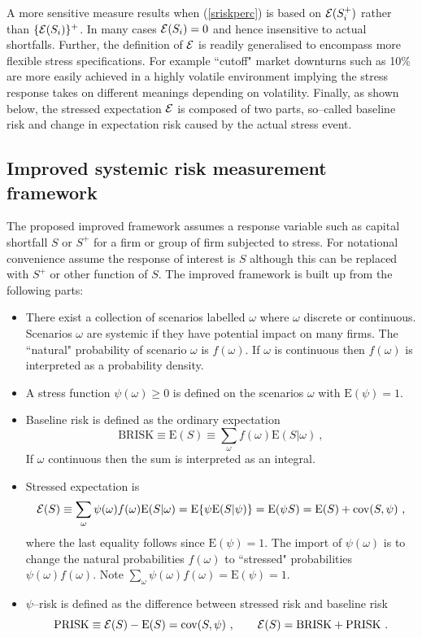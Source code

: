 \documentclass[authoryear]{elsarticle}
\newcommand{\E}{\mathrm{E}}
\newcommand{\cov}{\mathrm{cov}}
\newcommand{\Ex}{{\cal E}}
\newcommand{\Es}{\Ex}
\newcommand{\bi}{\begin{itemize}}
\newcommand{\ei}{\end{itemize}}
\renewcommand{\i}{\item}
\newcommand{\br}{\ensuremath{\mathrm{BRISK}}}
\newcommand{\pr}{\ensuremath{\mathrm{PRISK}}}
\newcommand{\eref}[1]{(\ref{#1})}
\newcommand{\cq}{\ , \qquad}
\newcommand{\be}[1]{\begin{equation}\label{#1}}
\newcommand{\ee}{\end{equation}}
\begin{document}
A more sensitive measure results when \eref{sriskperc} is based on $\Es(S_i^+)$ rather than $\{\Es(S_i)\}^+$.   In many cases $\Es(S_i)=0$  and hence insensitive to actual shortfalls.   Further, the definition of $\Es$ is readily generalised to encompass more flexible stress specifications.   For example ``cutoff"  market downturns such as 10\%  are more easily achieved  in a highly volatile environment implying the stress response takes on different meanings depending on volatility.  Finally, as shown below, the stressed expectation $\Es$ is composed of two parts, so--called baseline risk and change in expectation risk caused by the actual stress event. 

\subsection{Improved systemic risk measurement framework}
The  proposed improved framework assumes a response variable such as capital shortfall $S$ or $S^+$ for a firm or group of firm subjected to stress.  For notational convenience assume the response of interest is $S$ although this can be replaced with $S^+$ or  other function of $S$.  The improved framework is built up from the following parts:
\bi
\i  There exist a collection of scenarios labelled $\omega$ where  $\omega$ discrete or continuous.   Scenarios $\omega$ are systemic if they have potential impact on many firms.  The ``natural" probability of scenario $\omega$ is $f(\omega)$.   If $\omega$ is continuous then $f(\omega)$ is interpreted as a probability density.

\i  A stress function $\psi(\omega)\ge 0$ is defined on the  scenarios $\omega$ with  $\E(\psi)=1$. 

\i  Baseline risk is defined as the ordinary expectation
$$
\br\equiv \E(S)\equiv\sum_\omega f(\omega) \E(S|\omega)\ ,
$$
  If $\omega$ continuous then the sum is interpreted as an integral.
  
\i Stressed expectation  is
\be{formula}
\Es(S) \equiv \sum_\omega \psi(\omega) f(\omega)\E(S|\omega)=\E\{\psi\E(S|\psi)\}=\E(\psi S)=\E(S)+\cov(S,\psi)\ ,
\ee
where the last equality follows since $\E(\psi)=1$.  The import of $\psi(\omega)$ is to change the natural probabilities $f(\omega)$ to ``stressed" probabilities $\psi(\omega)f(\omega)$.   Note $\sum_\omega\psi(\omega) f(\omega)=\E(\psi)=1$. 
 \i $\psi$--risk is defined as the difference between stressed risk and baseline risk
 $$
 \pr \equiv \Es(S)-\E(S) = \cov(S,\psi)\cq \Es(S)=\br+\pr\ .
 $$
\ei
\end{document}
